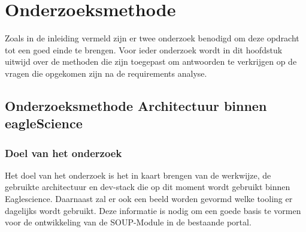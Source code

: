 
\chapter{Onderzoeksmethode}\label{ch:onderzoeksmethode} %

\label{OnderzoeksMethode} %
Zoals in de inleiding vermeld zijn er twee onderzoek benodigd om deze opdracht tot een goed einde te brengen.
Voor ieder onderzoek wordt in dit hoofdstuk uitwijd over de methoden die zijn toegepast om antwoorden te verkrijgen op de vragen die opgekomen zijn na de requirements analyse.
\section{Onderzoeksmethode Architectuur binnen eagleScience}\label{sec:onderzoeksmethode-architectuur-binnen-eaglescience}

\subsection{Doel van het onderzoek}\label{subsec:doel-van-het-onderzoek}
Het doel van het onderzoek is het in kaart brengen van de werkwijze, de gebruikte architectuur en dev-stack die op dit moment wordt gebruikt binnen Eaglescience.
Daarnaast zal er ook een beeld worden gevormd welke tooling er dagelijks wordt gebruikt.
Deze informatie is nodig om een goede basis te vormen voor de ontwikkeling van de SOUP-Module in de bestaande portal.


